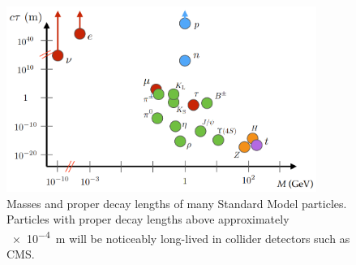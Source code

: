 \begin{figure}
\centering
\includegraphics[width=0.9\textwidth]{figures/intro/sm_llps.png}
\caption{Masses and proper decay lengths of many Standard Model particles. Particles with proper decay lengths above approximately \SI{e-4}{\m} will be noticeably long-lived in collider detectors such as CMS.}
\label{sm_llps}
\end{figure}